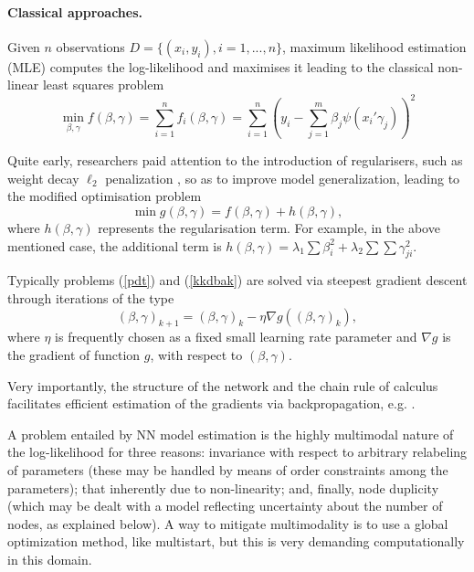 \paragraph{Classical approaches.}\label{sanchez}

Given $n$ observations $D=\{ (x_i, y_i), i=1,...,n \}$,
 maximum likelihood estimation (MLE) 
 computes the log-likelihood and maximises it 
leading to the classical non-linear least squares problem
\begin{equation}\label{pdt}
 \min_{\beta , \gamma } f (\beta , \gamma) = \sum _{i=1}^n f_i(\beta, \gamma)  =\sum _{i=1}^n \left( y_i -
  \sum_{j=1}^m \beta_j \psi(x_i'\gamma_j) \right)^2 
 \end{equation}

\noindent Quite early, researchers paid attention to the introduction of regularisers, such as weight decay $\ell_2$ penalization \parencite{krogh1992simple}, so as to improve model 
generalization, leading to the modified optimisation problem
\begin{equation}\label{kkdbak}
 \min  g(\beta ,\gamma) = f (\beta ,\gamma ) +
 h (\beta ,\gamma ), \end{equation}
where $h(\beta , \gamma )$ represents the regularisation 
term. For example, in the above mentioned case, the 
additional term is  
$h(\beta , \gamma )= \lambda _1 \sum \beta_i ^2 +
\lambda _2 \sum \sum \gamma _{ji} ^2$. 

Typically problems (\ref{pdt}) and (\ref{kkdbak}) are solved via steepest gradient descent \parencite{meza} through iterations of the type
\[
   (\beta, \gamma )_{k+1}=
   (\beta, \gamma )_{k}- \eta \nabla g (  (\beta, \gamma )_{k} ),
   \]
where $\eta $ is frequently chosen as a fixed small learning rate parameter and $\nabla g $ is the gradient of function $g$, with respect to 
$(\beta ,\gamma )$. 


\noindent    Very importantly,  the structure of the network and the 
    chain rule of calculus %
    facilitates efficient estimation of the gradients 
    via backpropagation, e.g. \parencite{rumelhart1986learning}.
    
    A problem entailed by NN model estimation is the highly multimodal nature of
    the log-likelihood for three reasons:
    invariance with respect to arbitrary relabeling of
    parameters (these may
    be handled by means of order 
    constraints among the 
    parameters);
    that inherently due to non-linearity; and, finally, 
    node duplicity (which may be dealt 
    with a model reflecting uncertainty 
    about the number of nodes,
    as explained below).
A way to mitigate multimodality is to use a global optimization method, like multistart, but
this is very demanding computationally in this domain.

